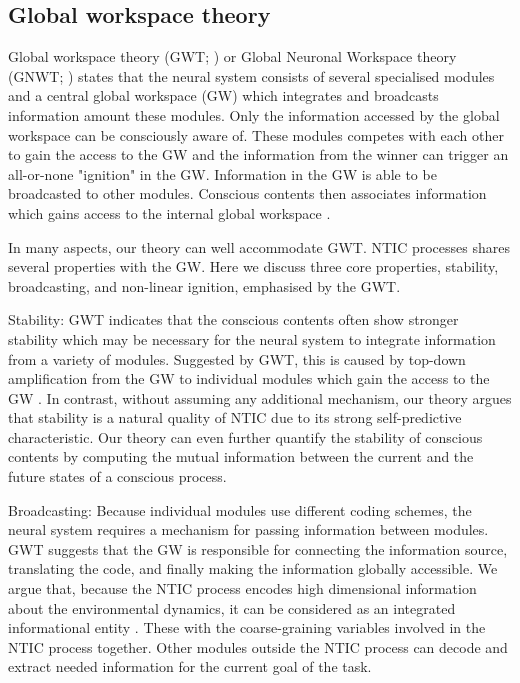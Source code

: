 \documentclass[utf8]{article}
\begin{document}
		\subsection{Global workspace theory}
		Global workspace theory (GWT; \cite{baars1988cognitive, baars1997theatre, baars2002conscious}) or Global Neuronal Workspace theory (GNWT; \cite{dehaene1998neuronal, dehaene2001towards, dehaene2011experimental}) states that the neural system consists of several specialised modules and a central global workspace (GW) which integrates and broadcasts information amount these modules. Only the information accessed by the global workspace can be consciously aware of. These modules competes with each other to gain the access to the GW and the information from the winner can trigger an all-or-none "ignition" in the GW. Information in the GW is able to be broadcasted to other modules. Conscious contents then associates information which gains access to the internal global workspace \cite{Dehaene2017}.
		
		In many aspects, our theory can well accommodate GWT. NTIC processes shares several properties with the GW. Here we discuss three core properties, stability, broadcasting, and non-linear ignition, emphasised by the GWT. 

		Stability: GWT indicates that the conscious contents often show stronger stability which may be necessary for the neural system to integrate information from a variety of modules. Suggested by GWT, this is caused by top-down amplification from the GW to individual modules which gain the access to the GW \needref{}. In contrast, without assuming any additional mechanism, our theory argues that stability is a natural quality of NTIC due to its strong self-predictive characteristic. Our theory can even further quantify the stability of conscious contents by computing the mutual information between the current and the future states of a conscious process. 
		
		Broadcasting: Because individual modules use different coding schemes, the neural system requires a mechanism for passing information between modules. GWT suggests that the GW is responsible for connecting the information source, translating the code, and finally making the information globally accessible. We argue that, because the NTIC process encodes high dimensional information about the environmental dynamics, it can be considered as an integrated informational entity . These with the coarse-graining variables involved in the NTIC process together. Other modules outside the NTIC process can decode and extract needed information for the current goal of the task. 
        
\end{document}
